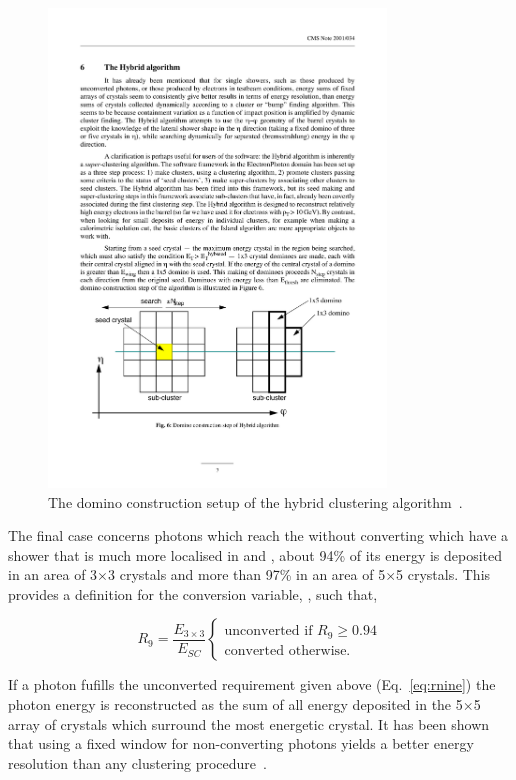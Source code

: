 \begin{figure}
  \includegraphics[width=0.8\textwidth]{ch2_cms_exp/plots/hybrid_clustering.pdf}
  \caption{The domino construction setup of the hybrid clustering algorithm~\cite{ecal_electron_reco}.}
  \label{fig:hybrid_algo}
\end{figure}

The final case concerns photons which reach the \ECAL without converting which have a shower that is much more localised in \eta and \phi, about 94\% of its energy is deposited in an area of 3$\times$3 crystals and more than 97\% in an area of 5$\times$5 crystals. This provides a definition for the conversion variable, \rnine, such that, 

\begin{equation}
	R_{9} = \frac{E_{3\times3}}{E_{SC}} 
	\begin{cases}
		\text{unconverted if } R_9\geq0.94 \\
		\text{converted otherwise}.
	\end{cases}
  \label{eq:rnine}
\end{equation}

If a photon fufills the unconverted requirement given above (Eq.~\ref{eq:rnine}) the photon energy is reconstructed as the sum of all energy deposited in the 5$\times$5 array of crystals which surround the most energetic crystal. It has been shown that using a fixed window for non-converting photons yields a better energy resolution than any clustering procedure~\cite{ecal_electron_reco}.


